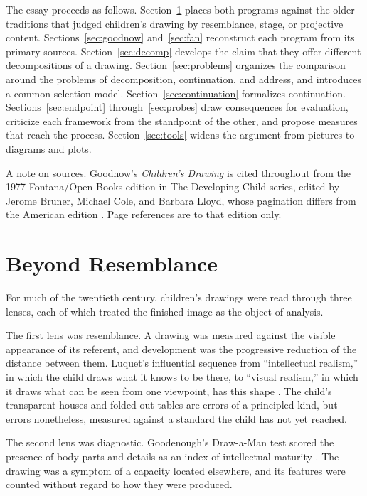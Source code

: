 \documentclass[11pt]{article}
\theoremstyle{remark}
\begin{document}
The essay proceeds as follows. Section~\ref{sec:tradition} places both programs against the older traditions that judged children's drawing by resemblance, stage, or projective content. Sections~\ref{sec:goodnow} and~\ref{sec:fan} reconstruct each program from its primary sources. Section~\ref{sec:decomp} develops the claim that they offer different decompositions of a drawing. Section~\ref{sec:problems} organizes the comparison around the problems of decomposition, continuation, and address, and introduces a common selection model. Section~\ref{sec:continuation} formalizes continuation. Sections~\ref{sec:endpoint} through~\ref{sec:probes} draw consequences for evaluation, criticize each framework from the standpoint of the other, and propose measures that reach the process. Section~\ref{sec:tools} widens the argument from pictures to diagrams and plots.

A note on sources. Goodnow's \emph{Children's Drawing} is cited throughout from the 1977 Fontana/Open Books edition in The Developing Child series, edited by Jerome Bruner, Michael Cole, and Barbara Lloyd, whose pagination differs from the American edition \cite{goodnow1977}. Page references are to that edition only.

\section{Beyond Resemblance}
\label{sec:tradition}

For much of the twentieth century, children's drawings were read through three lenses, each of which treated the finished image as the object of analysis.

The first lens was resemblance. A drawing was measured against the visible appearance of its referent, and development was the progressive reduction of the distance between them. Luquet's influential sequence from ``intellectual realism,'' in which the child draws what it knows to be there, to ``visual realism,'' in which it draws what can be seen from one viewpoint, has this shape \cite{luquet1927}. The child's transparent houses and folded-out tables are errors of a principled kind, but errors nonetheless, measured against a standard the child has not yet reached.

The second lens was diagnostic. Goodenough's Draw-a-Man test scored the presence of body parts and details as an index of intellectual maturity \cite{goodenough1926}. The drawing was a symptom of a capacity located elsewhere, and its features were counted without regard to how they were produced.
\end{document}
